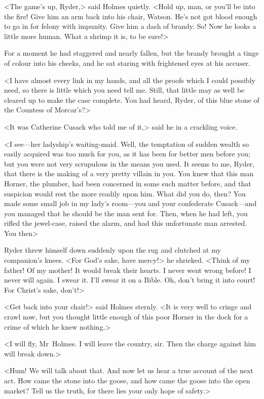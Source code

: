<The game's up, Ryder,> said Holmes quietly. <Hold up, man, or you'll be into the fire! Give him an arm back into his chair, Watson. He's not got blood enough to go in for felony with impunity. Give him a dash of brandy. So! Now he looks a little more human. What a shrimp it is, to be sure!>

For a moment he had staggered and nearly fallen, but the brandy brought a tinge of colour into his cheeks, and he sat staring with frightened eyes at his accuser.

<I have almost every link in my hands, and all the proofs which I could possibly need, so there is little which you need tell me. Still, that little may as well be cleared up to make the case complete. You had heard, Ryder, of this blue stone of the Countess of Morcar's?>

<It was Catherine Cusack who told me of it,> said he in a crackling voice.

<I see—her ladyship's waiting-maid. Well, the temptation of sudden wealth so easily acquired was too much for you, as it has been for better men before you; but you were not very scrupulous in the means you used. It seems to me, Ryder, that there is the making of a very pretty villain in you. You knew that this man Horner, the plumber, had been concerned in some such matter before, and that suspicion would rest the more readily upon him. What did you do, then? You made some small job in my lady's room—you and your confederate Cusack—and you managed that he should be the man sent for. Then, when he had left, you rifled the jewel-case, raised the alarm, and had this unfortunate man arrested. You then\longdash>

Ryder threw himself down suddenly upon the rug and clutched at my companion's knees. <For God's sake, have mercy!> he shrieked. <Think of my father! Of my mother! It would break their hearts. I never went wrong before! I never will again. I swear it. I'll swear it on a Bible. Oh, don't bring it into court! For Christ's sake, don't!>

<Get back into your chair!> said Holmes sternly. <It is very well to cringe and crawl now, but you thought little enough of this poor Horner in the dock for a crime of which he knew nothing.>

<I will fly, Mr~Holmes. I will leave the country, sir. Then the charge against him will break down.>

<Hum! We will talk about that. And now let us hear a true account of the next act. How came the stone into the goose, and how came the goose into the open market? Tell us the truth, for there lies your only hope of safety.>

